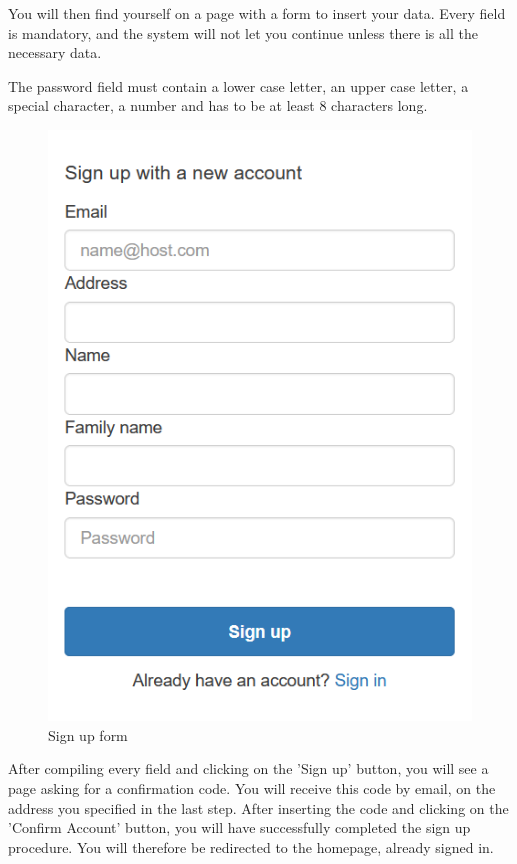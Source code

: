 You will then find yourself on a page with a form to insert your data. Every field is mandatory, and the system will not let you continue unless there is all the necessary data. 

The password field must contain a lower case letter, an upper case letter, a special character, a number and has to be at least 8 characters long.

\begin{figure}[H]
\centering
\includegraphics[scale=0.6]{res/Immagini/RegisterForm}
\caption{Sign up form}
\end{figure}

After compiling every field and clicking on the 'Sign up' button, you will see a page asking for a confirmation code. You will receive this code by email, on the address you specified in the last step. After inserting the code and clicking on the 'Confirm Account' button, you will have successfully completed the sign up procedure. You will therefore be redirected to the homepage, already signed in.

